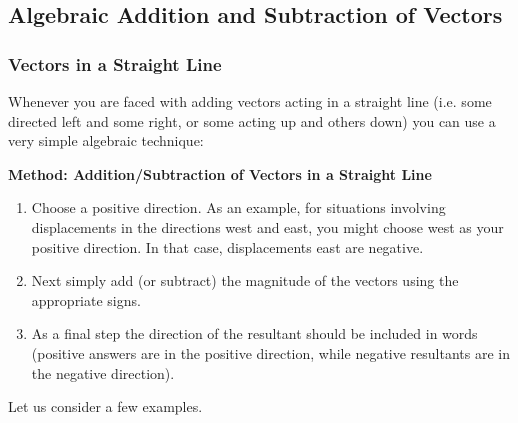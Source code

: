     
    
    
    
    
  
      \label{m38816*uid55}
            \subsection{ Algebraic Addition and Subtraction of Vectors}
            \nopagebreak
            
        
        \label{m38816*uid56}
            \subsubsection{ Vectors in a Straight Line}
            \nopagebreak
            
          
          \label{m38816*id190264}Whenever you are faced with adding vectors acting in a straight line (i.e. some directed left and some right, or some acting up and others down) you can use a very simple algebraic technique:\par 
          \label{m38816*id190269}
            \textbf{Method: Addition/Subtraction of Vectors in a Straight Line}
          \par 
          \label{m38816*id190277}\begin{enumerate}[noitemsep, label=\textbf{\arabic*}. ] 
            \label{m38816*uid57}\item Choose a positive direction. As an example, for
situations involving displacements in the directions west and east, you
might choose west as your positive direction. In that case,
displacements east are negative.
\label{m38816*uid58}\item Next simply add (or subtract) the
magnitude of the vectors using the appropriate signs.
\label{m38816*uid59}\item As a final step the direction of the resultant should be included in
words (positive answers are in the positive direction, while negative
resultants are in the negative direction).
\end{enumerate}
        
          \label{m38816*id190321}Let us consider a few examples.\par 
\label{m38816*secfhsst!!!underscore!!!id999}\vspace{.5cm} 
      
